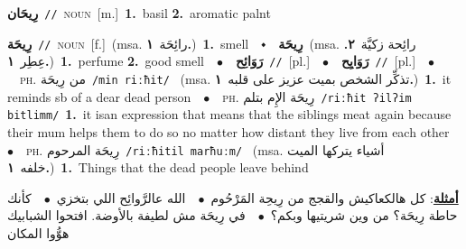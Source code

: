 \documentclass[10pt,a4paper,twoside]{article} %
\begin{document}
\begin{multicols}{2}
{\setlength\topsep{0pt}\textbf{\foreignlanguage{arabic}{رِيحَان}}\ {\color{gray}\texttt{//}\color{black}}\ \textsc{noun}\ [m.]\ \textbf{1.}~basil  \textbf{2.}~aromatic palnt\ } \vspace{2mm}

{\setlength\topsep{0pt}\textbf{\foreignlanguage{arabic}{رِيحَة}}\ {\color{gray}\texttt{//}\color{black}}\ \textsc{noun}\ [f.]\ \color{gray}(msa. \foreignlanguage{arabic}{رائِحَة}~\foreignlanguage{arabic}{\textbf{١.}})\color{black}\ \textbf{1.}~smell\ \ $\smblkdiamond$\ \ \setlength\topsep{0pt}\textbf{\foreignlanguage{arabic}{رِيحَة}}\ \color{gray}(msa. \foreignlanguage{arabic}{رائِحة زكيَّة}~\foreignlanguage{arabic}{\textbf{٢.}}  \foreignlanguage{arabic}{عِطِر}~\foreignlanguage{arabic}{\textbf{١.}})\color{black}\ \textbf{1.}~perfume  \textbf{2.}~good smell\ \ $\bullet$\ \ \setlength\topsep{0pt}\textbf{\foreignlanguage{arabic}{رَوَائِح}}\ {\color{gray}\texttt{//}\color{black}}\ [pl.]\ \ $\bullet$\ \ \setlength\topsep{0pt}\textbf{\foreignlanguage{arabic}{رَوَايِح}}\ {\color{gray}\texttt{//}\color{black}}\ [pl.]\ \ $\bullet$\ \ \textsc{ph.} \color{gray} \foreignlanguage{arabic}{من رِيحَة}\color{black}\ {\color{gray}\texttt{/{\sffamily min riːħit}/}\color{black}}\ \color{gray} (msa. \foreignlanguage{arabic}{تذكِّر الشخص بميت عزيز على قلبه}~\foreignlanguage{arabic}{\textbf{١.}})\color{black}\ \textbf{1.}~it reminds sb of a dear dead person\ \ $\bullet$\ \ \textsc{ph.} \color{gray} \foreignlanguage{arabic}{رِيحَة الإِم بتلم}\color{black}\ {\color{gray}\texttt{/{\sffamily riːħit ʔilʔim bitlimm}/}\color{black}}\ \textbf{1.}~it isan expression that means that the siblings meat again because their mum helps them to do so no matter how distant they live from each other\ \ $\bullet$\ \ \textsc{ph.} \color{gray} \foreignlanguage{arabic}{رِيحَة المرحوم}\color{black}\ {\color{gray}\texttt{/{\sffamily riːħitil marħuːm}/}\color{black}}\ \color{gray} (msa. \foreignlanguage{arabic}{أشياء يتركها الميت خلفه}~\foreignlanguage{arabic}{\textbf{١.}})\color{black}\ \textbf{1.}~Things that the dead people leave behind\  \begin{flushright}\color{gray}\foreignlanguage{arabic}{\textbf{\underline{\foreignlanguage{arabic}{أمثلة}}}: كل هالكعاكيش والقجج من رِيحِة المَرْحُوم\ $\bullet$\ \  الله عالرَّوائِح اللي بتخزي\ $\bullet$\ \  كأنك حاطة رِيحَة؟ من وين شريتيها وبكم؟\ $\bullet$\ \  في رِيحَة مش لطيفة بالأوضة. افتحوا الشبابيك هوُّوا المكان}\end{flushright}\color{black}} \vspace{2mm}


\end{multicols}
\end{document}

